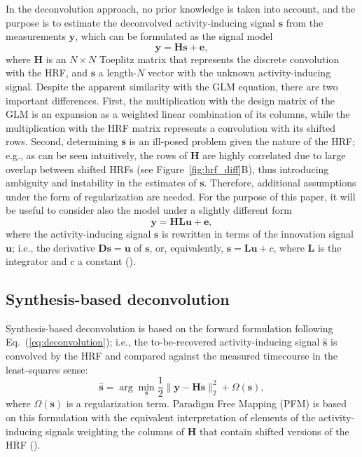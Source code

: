 In the deconvolution approach, no prior knowledge is taken into account, and the purpose is to estimate the deconvolved activity-inducing signal $\mathbf{s}$ from the measurements $\mathbf{y}$, which can be formulated as the signal model
\begin{equation}
    \label{eq:deconvolution}
    \mathbf{y} = \mathbf{Hs} + \mathbf{e},
\end{equation}
where $\mathbf{H}$ is an $N\times N$ Toeplitz matrix that represents the discrete convolution with the HRF, and $\mathbf{s}$ a length-$N$ vector with the unknown activity-inducing signal. Despite the apparent similarity with the GLM equation, there are two important differences. First, the multiplication with the design matrix of the GLM is an expansion as a weighted linear combination of its columns, while the multiplication with the HRF matrix represents a convolution with its shifted rows. Second, determining $\mathbf{s}$ is an ill-posed problem given the nature of the HRF; e.g., as can be seen intuitively, the rows of $\mathbf{H}$ are highly correlated due to large overlap between shifted HRFs (see Figure~\ref{fig:hrf_diff}B), thus introducing ambiguity and instability in the estimates of $\mathbf{s}$. Therefore, additional assumptions under the form of regularization are needed. For the purpose of this paper, it will be useful to consider also the model under a slightly different form
$$
\mathbf{y} = \mathbf{H L u} + \mathbf{e},
$$
where the activity-inducing signal $\mathbf{s}$ is rewritten in terms of the innovation signal $\mathbf{u}$; i.e., the derivative $\mathbf{Ds}=\mathbf{u}$ of $\mathbf{s}$, or, equivalently, $\mathbf{s}=\mathbf{Lu}+c$, where $\mathbf{L}$ is the integrator and $c$ a constant (\citealt{cherkaoui2019SparsitybasedBlindDeconvolution,urunuela2020StabilityBasedSparseParadigm}). 


\subsection{Synthesis-based deconvolution}
Synthesis-based deconvolution is based on the forward formulation following Eq.~(\ref{eq:deconvolution}); i.e., the to-be-recovered activity-inducing signal $\hat{\mathbf{s}}$ is convolved by the HRF and compared against the measured timecourse in the least-squares sense: 
\begin{equation}
    \label{eq:pfm}
    \hat{\mathbf{s}} = \arg \min_{\mathbf{s}} \frac{1}{2} \| \mathbf{y} - \mathbf{Hs} \|_2^2 + \Omega(\mathbf{s}),
\end{equation}
where \(\Omega(\mathbf{s})\) is a regularization term. Paradigm Free Mapping (PFM) is based on this formulation with the equivalent interpretation of elements of the activity-inducing signals weighting the columns of $\mathbf{H}$ that contain shifted versions of the HRF (\citealt{gaudes2011DetectionCharacterizationSingletrial,caballerogaudes2013ParadigmFreeMapping,urunuela2020StabilityBasedSparseParadigm}). 


